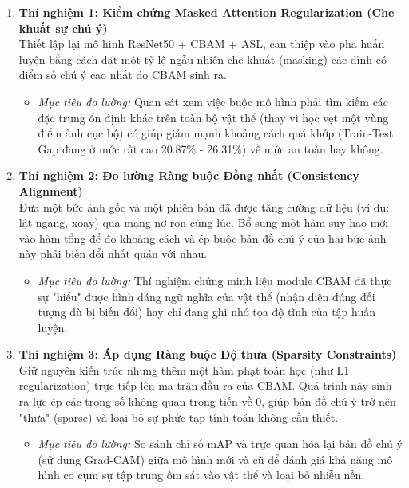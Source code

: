 \documentclass{article}
\begin{document}
\begin{enumerate}
    \item \textbf{Thí nghiệm 1: Kiểm chứng Masked Attention Regularization (Che khuất sự chú ý)}\\
    Thiết lập lại mô hình ResNet50 + CBAM + ASL, can thiệp vào pha huấn luyện bằng cách đặt một tỷ lệ ngẫu nhiên che khuất (masking) các đỉnh có điểm số chú ý cao nhất do CBAM sinh ra.
    \begin{itemize}
        \item \textit{Mục tiêu đo lường:} Quan sát xem việc buộc mô hình phải tìm kiếm các đặc trưng ổn định khác trên toàn bộ vật thể (thay vì học vẹt một vùng điểm ảnh cục bộ) có giúp giảm mạnh khoảng cách quá khớp (Train-Test Gap đang ở mức rất cao 20.87\% - 26.31\%) về mức an toàn hay không.
    \end{itemize}

    \item \textbf{Thí nghiệm 2: Đo lường Ràng buộc Đồng nhất (Consistency Alignment)}\\
    Đưa một bức ảnh gốc và một phiên bản đã được tăng cường dữ liệu (ví dụ: lật ngang, xoay) qua mạng nơ-ron cùng lúc. Bổ sung một hàm suy hao mới vào hàm tổng để đo khoảng cách và ép buộc bản đồ chú ý của hai bức ảnh này phải biến đổi nhất quán với nhau.
    \begin{itemize}
        \item \textit{Mục tiêu đo lường:} Thí nghiệm chứng minh liệu module CBAM đã thực sự "hiểu" được hình dáng ngữ nghĩa của vật thể (nhận diện đúng đối tượng dù bị biến đổi) hay chỉ đang ghi nhớ tọa độ tĩnh của tập huấn luyện.
    \end{itemize}

    \item \textbf{Thí nghiệm 3: Áp dụng Ràng buộc Độ thưa (Sparsity Constraints)}\\
    Giữ nguyên kiến trúc nhưng thêm một hàm phạt toán học (như L1 regularization) trực tiếp lên ma trận đầu ra của CBAM. Quá trình này sinh ra lực ép các trọng số không quan trọng tiến về 0, giúp bản đồ chú ý trở nên "thưa" (sparse) và loại bỏ sự phức tạp tính toán không cần thiết.
    \begin{itemize}
        \item \textit{Mục tiêu đo lường:} So sánh chỉ số mAP và trực quan hóa lại bản đồ chú ý (sử dụng Grad-CAM) giữa mô hình mới và cũ để đánh giá khả năng mô hình co cụm sự tập trung ôm sát vào vật thể và loại bỏ nhiễu nền.
    \end{itemize}
\end{enumerate}
\end{document}
